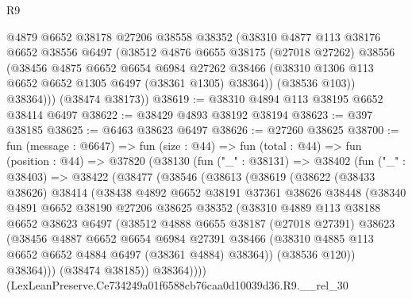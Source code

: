 \begin{lexlean}{R9}
\begin{coremodule}
          @4879
          @6652
          @38178
          @27206
          @38558
          @38352
          (@38310
            @4877
            @113
            @38176
            @6652
            @38556
            @6497
            (@38512
              @4876
              @6655
              @38175
              (@27018 @27262)
              @38556
              (@38456
                @4875
                @6652
                @6654
                @6984
                @27262
                @38466
                (@38310 @1306 @113 @6652 @6652 @1305 @6497 (@38361 @1305) @38364))
              (@38536 @103))
            @38364)))
      (@38474 @38173))
@38619 := @38310 @4894 @113 @38195 @6652 @38414 @6497
@38622 := @38429 @4893 @38192 @38194
@38623 := @397 @38185
@38625 := @6463 @38623 @6497
@38626 := @27260 @38625
@38700 := fun (message : @6647) =>
  fun (size : @44) =>
  fun (total : @44) =>
  fun (position : @44) =>
  @37820
    (@38130
      (fun ("_" : @38131) =>
      @38402
        (fun ("_" : @38403) =>
        @38422
          (@38477
            (@38546
              (@38613
                (@38619
                  (@38622
                    (@38433 @38626)
                    @38414
                    (@38438
                      @4892
                      @6652
                      @38191
                      @37361
                      @38626
                      @38448
                      (@38340
                        @4891
                        @6652
                        @38190
                        @27206
                        @38625
                        @38352
                        (@38310
                          @4889
                          @113
                          @38188
                          @6652
                          @38623
                          @6497
                          (@38512
                            @4888
                            @6655
                            @38187
                            (@27018 @27391)
                            @38623
                            (@38456
                              @4887
                              @6652
                              @6654
                              @6984
                              @27391
                              @38466
                              (@38310 @4885 @113 @6652 @6652 @4884 @6497 (@38361 @4884) @38364))
                            (@38536 @120))
                          @38364)))
                    (@38474 @38185))
                  @38364))))
          (LexLeanPreserve.Ce734249a01f6588cb76caa0d10039d36.R9.__rel_30

\end{coremodule}
\end{lexlean}
